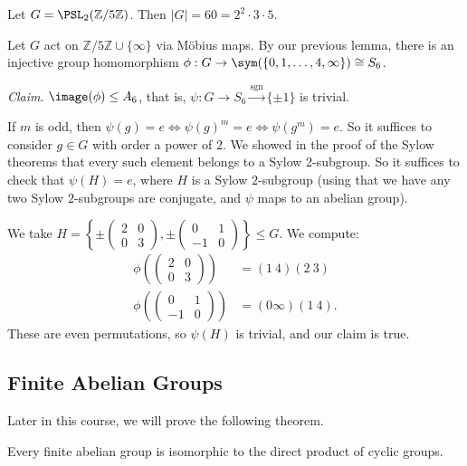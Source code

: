 \documentclass[a4paper]{scrartcl}
\begin{document}
\begin{example}
	Let $G = \PSL_2(\mathbb{Z}/5\mathbb{Z})$. Then $|G| = 60 = 2^2 \cdot 3 \cdot 5$.

	Let $G$ act on $\mathbb{Z}/5\mathbb{Z} \cup \{\infty\}$ via Möbius maps. By our previous lemma, there is an injective group homomorphism $\phi : G \rightarrow \sym(\{0, 1, \dots, 4, \infty\}) \cong S_6$.

	\emph{Claim}. $\image(\phi) \leq A_6$, that is, $\psi: G \rightarrow S_6 \xrightarrow{\operatorname{sgn}} \{\pm 1\}$ is trivial.

	If $m$ is odd, then $\psi(g) = e \iff \psi(g)^m = e \iff \psi(g^m) = e$. So it suffices to consider $g \in G$ with order a power of 2. We showed in the proof of the Sylow theorems that every such element belongs to a Sylow 2-subgroup. So it suffices to check that $\psi(H) = e$, where $H$ is a Sylow $2$-subgroup (using that we have any two Sylow $2$-subgroups are conjugate, and $\psi$ maps to an abelian group). 

	We take $H =\left\{ \pm \begin{pmatrix}
		2 & 0 \\ 0 & 3
	\end{pmatrix},\pm \begin{pmatrix}
		0 & 1 \\ -1 & 0 
	\end{pmatrix} \right \} \leq G$. We compute:
	\begin{align*}
		\phi\left(\begin{pmatrix}
			2 & 0 \\ 0 & 3
		\end{pmatrix}\right) &= (1\ 4)(2\ 3)\\
		\phi\left(\begin{pmatrix}
		0 & 1 \\ -1 & 0
		\end{pmatrix}\right) &= (0 \infty)(1\ 4).
	\end{align*} 
	These are even permutations, so $\psi(H)$ is trivial, and our claim is true.
\end{example}

\subsection{Finite Abelian Groups}

Later in this course, we will prove the following theorem.

\begin{theorem}
	Every finite abelian group is isomorphic to the direct product of cyclic groups.
\end{theorem}
\end{document}
